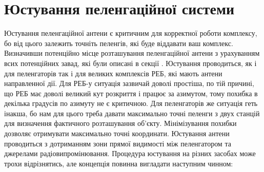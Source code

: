 \documentclass{article}
\begin{document}
\section{Юстування пеленгаційної системи}

Юстування пеленгаційної антени є критичним для корректної роботи комплексу, бо від цього залежить точніть пеленгів, які буде віддавати ваш комплекс. Визначивши потенційно місце розташування пеленгаційної антени з урахуванням всих потенційних завад, які були описані в секції . Юстування проводиться, як і для пеленгаторів так і для великих комплексів РЕБ, які мають антени направленної дії. Для РЕБ-у ситуація зазвичай доволі простіша, по тій причині, що РЕБ має доволі великий кут розкриття і працює за азимутом, тому похибка в декілька градусів по азимуту не є критичною. Для пеленгаторів же ситуація геть інакша, бо нам для цього треба давати максимально точні пеленги з двух станцій для визначення фактичного розташування об'єкту. Мінімізування похибки дозволяє отримувати максимально точні координати. Юстування антени проводиться з дотриманням зони прямої видимості між пеленгатором та джерелами радіовипромінювання. Процедура юстування на різних засобах може трохи відрізнятись, але концепція повинна вигладати наступним чинном:
\end{document}
